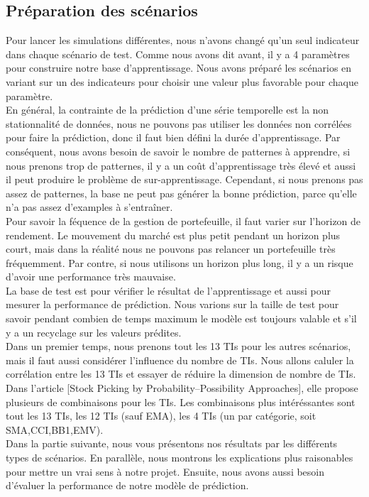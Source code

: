 \subsection{Préparation des scénarios}

Pour lancer les simulations différentes, nous n'avons changé qu'un seul indicateur dans chaque scénario de test. Comme nous avons dit avant, il y a 4 paramètres pour construire notre base d'apprentissage. Nous avons préparé les scénarios en variant sur un des indicateurs pour choisir une valeur plus favorable pour chaque paramètre. \\

En général, la contrainte de la prédiction d'une série temporelle est la non stationnalité de données, nous ne pouvons pas utiliser les données non corrélées pour faire la prédiction, donc il faut bien défini la durée d'apprentissage. Par conséquent, nous avons besoin de savoir le nombre de patternes à apprendre, si nous prenons trop de patternes, il y a un coût d'apprentissage très élevé et aussi il peut produire le problème de sur-apprentissage. Cependant, si nous prenons pas assez de patternes, la base ne peut pas générer la bonne prédiction, parce qu'elle n'a pas assez d'examples à s'entraîner. \\

Pour savoir la féquence de la gestion de portefeuille, il faut varier sur l'horizon de rendement. Le mouvement du marché est plus petit pendant un horizon plus court, mais dans la réalité nous ne pouvons pas relancer un portefeuille très fréquemment. Par contre, si nous utilisons un horizon plus long, il y a un risque d'avoir une performance très mauvaise. \\

La base de test est pour vérifier le résultat de l'apprentissage et aussi pour mesurer la performance de prédiction. Nous varions sur la taille de test pour savoir pendant combien de temps maximum le modèle est toujours valable et s'il y a un recyclage sur les valeurs prédites. \\

Dans un premier temps, nous prenons tout les 13 TIs pour les autres scénarios, mais il faut aussi considérer l'influence du nombre de TIs. Nous allons caluler la corrélation entre les 13 TIs et essayer de réduire la dimension de nombre de TIs. Dans l'article [Stock Picking by Probability–Possibility Approaches], elle propose plusieurs de combinaisons pour les TIs. Les combinaisons plus intéréssantes sont tout les 13 TIs, les 12 TIs (sauf EMA), les 4 TIs (un par catégorie, soit SMA,CCI,BB1,EMV).\\

Dans la partie suivante, nous vous présentons nos résultats par les différents types de scénarios. En parallèle, nous montrons les explications plus raisonables pour mettre un vrai sens à notre projet. Ensuite, nous avons aussi besoin d'évaluer la performance de notre modèle de prédiction.




  





